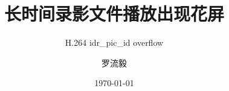 \title{长时间录影文件播放出现花屏}
\subtitle{H.264 idr\_pic\_id overflow}
\author{罗流毅}
\date{\today}
\def\website{}

